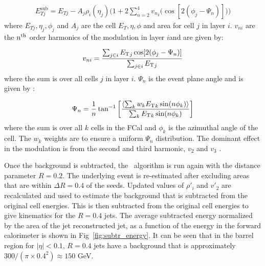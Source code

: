 \begin{align}
E_{Tj}^{\mathrm{sub}} = E_{Tj} - A_j \rho_i (\eta_j) \Big(1+2 \sum_{n=2}^{4} {v_{n}}_i \big(\cos[2(\phi_j-\Psi_n)] \big) \Big)
\end{align}
where $E_{Tj} , \eta_j, \phi_j$ and $A_j$ are the cell $E_T, \eta, \phi$ and area for cell $j$ in layer $i$.
$v_{ni}$ are the $n^{\rm th}$ order harmonics of the modulation in layer $i$and are given by:

\begin{align}
v_{ni} = \frac{\sum_{j \in i} \mbox{$E_{\mathrm{T}}$}_j \cos[2(\phi_j-\Psi_n)]}{\sum_{j \in i} \mbox{$E_{\mathrm{T}}$}_j}
\end{align}
where the sum is over all cells $j$ in layer $i$.
$\Psi_n$ is the event plane angle and is given by \cite{ATLAS:2012at}:

\begin{align}
\Psi_n = \frac{1}{n} \tan^{-1} \left[ \frac{\langle \sum_k w_k \mbox{$E_{\mathrm{T}}$}_k \sin(n\phi_k) \rangle}{\sum_k \mbox{$E_{\mathrm{T}}$}_k \sin(n\phi_k)} \right]
\end{align}
where the sum is over all $k$ cells in the FCal and $\phi_k$ is the azimuthal angle of the cell.
The $w_k$ weights are to ensure a uniform $\Psi_n$ distribution.
The dominant effect in the modulation is from the second and third harmonic, $v_2$ and $v_3$ \cite{ATLAS:2012at}.

Once the background is subtracted, the \antikt\ algorithm is run again with the distance parameter $R = 0.2$.
The underlying event is re-estimated after excluding areas that are within $\Delta R = 0.4$ of the seeds.
Updated values of $\rho{'}_i$ and $v{'}_2$ are recalculated and used to estimate the background that is subtracted from the original cell energies.
This is then subtracted from the original cell energies to give kinematics for the $R= 0.4$ jets.
The average subtracted energy normalized by the area of the jet reconstructed jet, as a function of the energy in the forward calorimeter is shown in Fig~\ref{fig:subtr_energy}.
It can be seen that in the barrel region for $|\eta| < 0.1$, $R=0.4$ jets have a background that is approximately $300/(\pi\times 0.4^2) \approx 150$ GeV.

